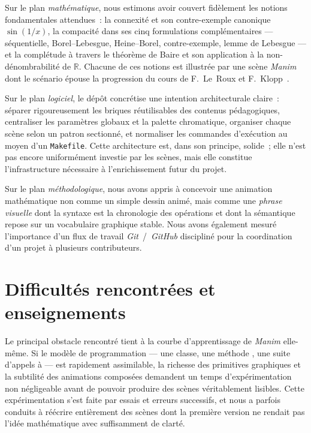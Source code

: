 \documentclass[12pt, a4paper, openany]{report}
\begin{document}
	Sur le plan \emph{mathématique}, nous estimons avoir couvert fidèlement les notions fondamentales attendues~: la connexité et son contre-exemple canonique $\sin(1/x)$, la compacité dans ses cinq formulations complémentaires — séquentielle, Borel--Lebesgue, Heine--Borel, contre-exemple, lemme de Lebesgue — et la complétude à travers le théorème de Baire et son application à la non-dénombrabilité de $\mathbb{R}$. Chacune de ces notions est illustrée par une scène \textit{Manim} dont le scénario épouse la progression du cours de F.~Le~Roux et F.~Klopp~\cite{lerouxklopp}.

	Sur le plan \emph{logiciel}, le dépôt concrétise une intention architecturale claire~: séparer rigoureusement les briques réutilisables des contenus pédagogiques, centraliser les paramètres globaux et la palette chromatique, organiser chaque scène selon un patron sectionné, et normaliser les commandes d’exécution au moyen d’un \texttt{Makefile}. Cette architecture est, dans son principe, solide~; elle n’est pas encore uniformément investie par les scènes, mais elle constitue l’infrastructure nécessaire à l’enrichissement futur du projet.

	Sur le plan \emph{méthodologique}, nous avons appris à concevoir une animation mathématique non comme un simple dessin animé, mais comme une \emph{phrase visuelle} dont la syntaxe est la chronologie des opérations et dont la sémantique repose sur un vocabulaire graphique stable. Nous avons également mesuré l’importance d’un flux de travail \textit{Git}~/~\textit{GitHub} discipliné pour la coordination d’un projet à plusieurs contributeurs.

	\section{Difficultés rencontrées et enseignements}

	Le principal obstacle rencontré tient à la courbe d’apprentissage de \textit{Manim} elle-même. Si le modèle de programmation — une classe, une méthode , une suite d’appels à  — est rapidement assimilable, la richesse des primitives graphiques et la subtilité des animations composées demandent un temps d’expérimentation non négligeable avant de pouvoir produire des scènes véritablement lisibles. Cette expérimentation s’est faite par essais et erreurs successifs, et nous a parfois conduits à réécrire entièrement des scènes dont la première version ne rendait pas l’idée mathématique avec suffisamment de clarté.
\end{document}

